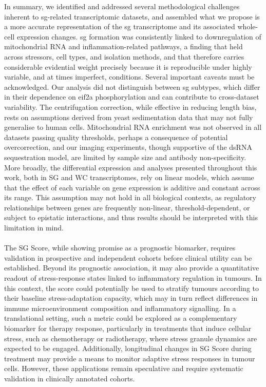In summary, we identified and addressed several methodological challenges inherent to \gls{sg}-related transcriptomic datasets, and assembled what we propose is a more accurate representation of the \gls{sg} transcriptome and its associated whole-cell expression changes. \gls{sg} formation was consistently linked to downregulation of mitochondrial RNA and inflammation-related pathways, a finding that held across stressors, cell types, and isolation methods, and that therefore carries considerable evidential weight precisely because it is reproducible under highly variable, and at times imperfect, conditions.
Several important caveats must be acknowledged. Our analysis did not distinguish between \gls{sg} subtypes, which differ in their dependence on \gls{eif2a} phosphorylation and can contribute to cross-dataset variability. The centrifugation correction, while effective in reducing length bias, rests on assumptions derived from yeast sedimentation data that may not fully generalise to human cells. Mitochondrial RNA enrichment was not observed in all datasets passing quality thresholds, perhaps a consequence of potential overcorrection, and our imaging experiments, though supportive of the dsRNA sequestration model, are limited by sample size and antibody non-specificity. More broadly, the differential expression and analyses presented throughout this work, both in SG and WC transcriptomes, rely on linear models, which assume that the effect of each variable on gene expression is additive and constant across its range. This assumption may not hold in all biological contexts, as regulatory relationships between genes are frequently non-linear, threshold-dependent, or subject to epistatic interactions, and thus results should be interpreted with this limitation in mind.
\\
\\
The SG Score, while showing promise as a prognostic biomarker, requires validation in prospective and independent cohorts before clinical utility can be established. Beyond its prognostic association, it may also provide a quantitative readout of stress-response states linked to inflammatory regulation in tumours. In this context, the score could potentially be used to stratify tumours according to their baseline stress-adaptation capacity, which may in turn reflect differences in immune microenvironment composition and inflammatory signalling.
In a translational setting, such a metric could be explored as a complementary biomarker for therapy response, particularly in treatments that induce cellular stress, such as chemotherapy or radiotherapy, where stress granule dynamics are expected to be engaged\cite{szaflarski_vinca_2016}. Additionally, longitudinal changes in SG Score during treatment may provide a means to monitor adaptive stress responses in tumour cells. However, these applications remain speculative and require systematic validation in clinically annotated cohorts.
